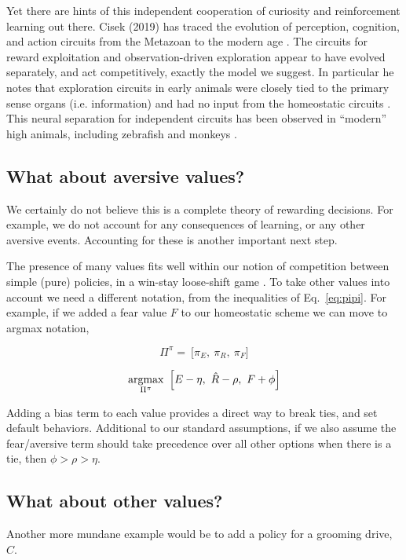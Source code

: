 Yet there are hints of this independent cooperation of curiosity and reinforcement learning out there. Cisek (2019) has traced the evolution of perception, cognition, and action circuits from the Metazoan to the modern age \cite{Cisek2019}. The circuits for reward exploitation and observation-driven exploration appear to have evolved separately, and act competitively, exactly the model we suggest. In particular he notes that exploration circuits in early animals were closely tied to the primary sense organs (i.e. information) and had no input from the homeostatic circuits \cite{Keramati2014,Cisek2019,Juechems2019}. This neural separation for independent circuits has been observed in ``modern'' high animals, including zebrafish \cite{Marques2019} and monkeys \cite{White2019,Wang2019}. 


\subsection*{What about aversive values?}
We certainly do not believe this is a complete theory of rewarding decisions. For example, we do not account for any consequences of learning, or any other aversive events. Accounting for these is another important next step.

The presence of many values fits well within our notion of competition between simple (pure) policies, in a win-stay loose-shift game \cite{Estes1994TowardAS}. To take other values into account we need a different notation, from the inequalities of Eq.~\ref{eq:pipi}. For example, if we added a fear value $F$ to our homeostatic scheme we can move to argmax notation,

\begin{equation}
\label{eq:pipi_f} 
\Pi^{\pi} = \ \Big [ \pi_E,\ \pi_R,\ \pi_F \Big ]
\end{equation}

\begin{equation}
\label{eq:meta_greedy_f} 
	\operatorname*{argmax}_{\Pi^{\pi}} \ \Big [ E - \eta,\ \hat R - \rho,\ F + \phi \Big ]
\end{equation}

Adding a bias term to each value provides a direct way to break ties, and set default behaviors. Additional to our standard assumptions, if we also assume the fear/aversive term should take precedence over all other options when there is a tie, then $\phi > \rho > \eta$.

\subsection*{What about other values?}
Another more mundane example would be to add a policy for a grooming drive, $C$. 

